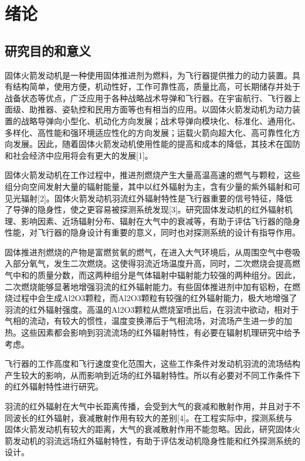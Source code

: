 \chapter{绪论}
\section{研究目的和意义}

固体火箭发动机是一种使用固体推进剂为燃料，为飞行器提供推力的动力装置。具有结构简单，使用方便，机动性好，工作可靠性高，质量比高，可长期储存并处于战备状态等优点，广泛应用于各种战略战术导弹和飞行器。在宇宙航行、飞行器上面级、助推器、姿轨控和民用方面等也有相当的应用。以固体火箭发动机为动力装置的战略导弹向小型化、机动化方向发展；战术导弹向模块化、标准化、通用化、多样化、高性能和强环境适应性化的方向发展；运载火箭向超大化、高可靠性化方向发展。因此，随着固体火箭发动机使用性能的提高和成本的降低，其技术在国防和社会经济中应用将会有更大的发展[1]。

固体火箭发动机在工作过程中，推进剂燃烧产生大量高温高速的燃气与颗粒，这些组分向空间发射大量的辐射能量，其中以红外辐射为主，含有少量的紫外辐射和可见光辐射[2]。固体火箭发动机羽流红外辐射特性是飞行器重要的信号特征，降低了导弹的隐身性，使之更容易被探测系统发现[3]。研究固体发动机的红外辐射机理、影响因素、近场辐射分布、辐射在大气中的衰减等，有助于评估飞行器的隐身性能，对飞行器的隐身设计有重要的意义，同时也对探测系统的设计有指导作用。

固体推进剂燃烧的产物是富燃贫氧的燃气，在进入大气环境后，从周围空气中卷吸入部分氧气，发生二次燃烧。这使得羽流近场温度升高，同时，二次燃烧会提高燃气中和的质量分数，而这两种组分是气体辐射中辐射能力较强的两种组分。因此，二次燃烧能够显著地增强羽流的红外辐射能力。有些固体推进剂中加有铝粉，在燃烧过程中会生成Al2O3颗粒，而Al2O3颗粒有较强的红外辐射能力，极大地增强了羽流的红外辐射强度。高温的Al2O3颗粒从燃烧室喷出后，在羽流中欲动，相对于气相的流动，有较大的惯性，温度变换滞后于气相流场，对流场产生进一步的加热。这些因素都会影响到羽流流场的红外辐射特性，有必要在辐射机理研究中给予考虑。

飞行器的工作高度和飞行速度变化范围大，这些工作条件对发动机羽流的流场结构产生较大的影响，从而影响到近场的红外辐射特性。所以有必要对不同工作条件下的红外辐射特性进行研究。

羽流的红外辐射在大气中长距离传播，会受到大气的衰减和散射作用，并且对于不同波长的红外辐射，衰减散射作用有较大的差别[4]。在工程实际中，探测系统与固体火箭发动机有较大的距离，大气的衰减散射作用不能忽略。因此，研究固体火箭发动机的羽流远场红外辐射特性，有助于评估发动机隐身性能和红外探测系统的设计。

